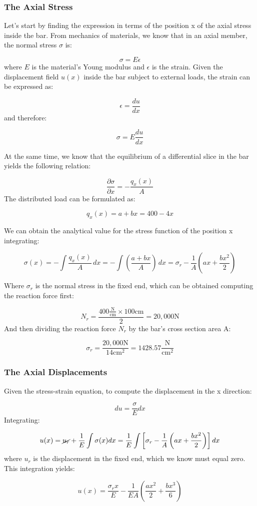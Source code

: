 \subsubsection{The Axial Stress}

Let's start by finding the expression in terms of the position x of the axial stress inside the bar.
From mechanics of materials, we know that in an axial member, the normal stress $\sigma$ is:

\[
  \sigma = E \epsilon  
\]
where $E$ is the material's Young modulus and $\epsilon$ is the strain.
Given the displacement field $u(x)$ inside the bar subject to external loads, the strain can be expressed as:

\[
  \epsilon = \frac{du}{dx}  
\]
and therefore:

\[
  \sigma = E \frac{du}{dx}
\]

At the same time, we know that the equilibrium of a differential slice in the bar yields the following relation:

\[
  \frac{\partial \sigma}{\partial x} = - \frac{q_x(x)}{A}  
\]
The distributed load can be formulated as:

\[
  q_x(x) = a + bx = 400 - 4x
\]

We can obtain the analytical value for the stress function of the position x integrating:

\[
  \sigma(x) = - \int \frac{q_x(x)}{A} \,dx 
  = - \int \left( \frac{a + bx}{A} \right) \,dx 
  = \sigma_r - \frac{1}{A} \left( ax + \frac{b x^2}{2} \right)
\]

Where $\sigma_r$ is the normal stress in the fixed end, which can be obtained computing the reaction force first:

\[
  N_r = \frac{400 \frac{\text{N}}{\text{cm}} \times 100 \text{cm}}{2} = 20,000 \text{N}
\]
And then dividing the reaction force $N_r$ by the bar's cross section area A:

\[
  \sigma_r = \frac{20,000 \text{N}}{14 \text{cm}^2} = 1428.57 \frac{\text{N}}{\text{cm}^2}
\]


\subsubsection{The Axial Displacements}

Given the stress-strain equation, to compute the displacement in the x direction:

\[
  du = \frac{\sigma}{E} dx  
\]
Integrating:

\[
  u(x) = \cancel{u_r} + \frac{1}{E} \int \sigma(x) dx = \frac{1}{E} \int \left[ \sigma_r - \frac{1}{A} \left( ax + \frac{b x^2}{2} \right) \right] dx
\]
where $u_r$ is the displacement in the fixed end, which we know must equal zero.
This integration yields:

\[
  u(x) = \frac{\sigma_r x}{E} - \frac{1}{EA} \left( \frac{a x^2}{2} + \frac{b x^3}{6} \right)  
\]
